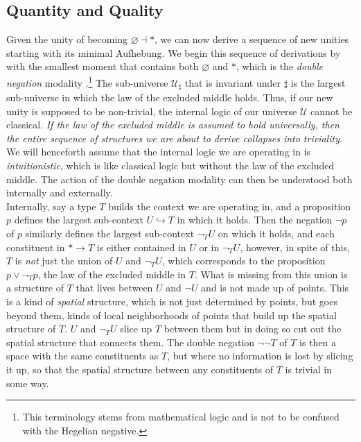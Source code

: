 \documentclass{article}
\begin{document}
\subsection{Quantity and Quality}
Given the unity of becoming $\varnothing\dashv *$, we can now derive a sequence of new unities starting with 
its minimal Aufhebung. We begin this sequence of derivations by with the smallest moment that contains both 
$\varnothing$ and $*$, which is the \emph{double negation} modality \cite{Sketches}.\footnote{This terminology
stems from mathematical logic and is not to be confused with the Hegelian negative.} The sub-universe 
$\mathcal{U}_\sharp$ that is invariant under $\sharp$ is the largest sub-universe in which the law of the 
excluded middle holds. Thus, if our new unity is supposed to be non-trivial, the internal logic of our 
universe $\mathcal{U}$ cannot be classical. \emph{If the law of the excluded middle is assumed to hold 
universally, then the entire sequence of structures we are about to derive collapses into triviality}. We 
will henceforth assume that the internal logic we are operating in is \emph{intuitionistic}, which is like 
classical logic but without the law of the excluded middle. The action of the double negation modality can 
then be understood both internally and externally. \\

Internally, say a type $T$ builds the context we are operating in, and a proposition $p$ defines the largest 
sub-context $U\hookrightarrow T$ in which it holds. Then the negation $\neg p$ of $p$ similarly defines the 
largest sub-context $\neg_T U$ on which it holds, and each constituent in $*\rightarrow T$ is either 
contained in $U$ or in $\neg_T U$, however, in spite of this, $T$ is \emph{not} just the union of $U$ and 
$\neg_T U$, which corresponds to the proposition $p\vee \neg_T p$, the law of the excluded middle in $T$. 
What is missing from this union is a structure of $T$ that lives between $U$ and $\neg U$ and is not made up 
of points. This is a kind of \emph{spatial} structure, which is not just determined by points, but goes 
beyond them, kinds of local neighborhoods of points that build up the spatial structure of $T$. $U$ and 
$\neg_T U$ slice up $T$ between them but in doing so cut out the spatial structure that connects them. The 
double negation $\neg\neg T$ of $T$ is then a space with the same constituents as $T$, but where no 
information is lost by slicing it up, so that the spatial structure between any constituents of $T$ is 
trivial in some way. \\
\end{document}
